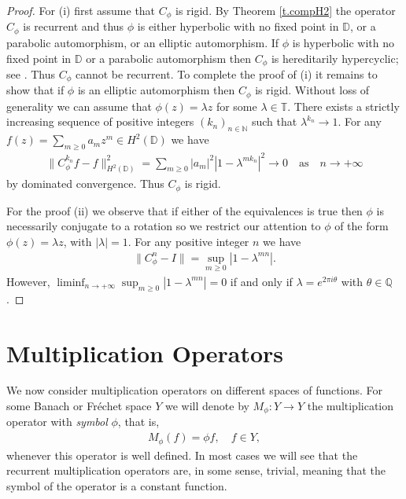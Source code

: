 \documentclass[12pt,leqno]{amsart}
\theoremstyle{plain}
\theoremstyle{definition}
\numberwithin{equation}{section}
\begin{document}
\begin{proof}
	For (i) first assume that $C_\phi$ is rigid. By Theorem \ref{t.compH2} the operator $C_\phi$ is recurrent and thus $\phi$ is either hyperbolic with no fixed point in $\mathbb D$, or a parabolic automorphism, or an elliptic automorphism. If $\phi$ is hyperbolic with no fixed point in $\mathbb D$ or a parabolic automorphism then $C_\phi$ is hereditarily hypercyclic; see \cite{BM}. Thus $C_\phi$ cannot be recurrent. To complete the proof of (i) it remains to show that if $\phi$ is an elliptic automorphism then $C_\phi$ is rigid. Without loss of generality we can assume that $\phi(z)=\lambda z$ for some $\lambda \in \mathbb T$. There exists a strictly increasing sequence of positive integers $(k_n)_{n\in\mathbb N}$ such that $\lambda^{k_n}\to 1$. For any $f(z)=\sum_{m\geq 0} a_m z^m \in H^2(\mathbb D)$ we have 
	\begin{align}
		\| C_\phi ^{k_n}f-f\|_{H^2(\mathbb D)} ^2 = \sum_{m\geq 0} |a_m|^2|1-\lambda^{m k_n}|^2\to 0\quad\text{as}\quad n\to+\infty 
	\end{align}
	by dominated convergence. Thus $C_\phi$ is rigid.
	
	For the proof (ii) we observe that if either of the equivalences is true then $\phi$ is necessarily conjugate to a rotation so we restrict our attention to $\phi$ of the form $\phi(z)=\lambda z$, with $|\lambda|=1$. For any positive integer $n$ we have 
	\begin{align*}
		\|C_\phi ^{n}- I\| = \sup_{m\geq 0} |1-\lambda^{m n}|. 
	\end{align*}
	However, $\liminf_{n\to+\infty}\sup_{m\geq 0}|1-\lambda^{m n}|= 0$ if and only if $\lambda=e^{2\pi i \theta}$ with $\theta \in \mathbb Q$. 
\end{proof}

\section{Multiplication Operators}\label{s.mult} We now consider multiplication operators on different spaces of functions. For some Banach or Fr\'echet space $Y$ we will denote by $M_\phi:Y\to Y$ the multiplication operator with \emph{symbol} $\phi$, that is, 
\begin{align*}
	M_\phi(f)=\phi f, \quad f\in Y, 
\end{align*}
whenever this operator is well defined. In most cases we will see that the recurrent multiplication operators are, in some sense, trivial, meaning that the symbol of the operator is a constant function. 
\end{document}
